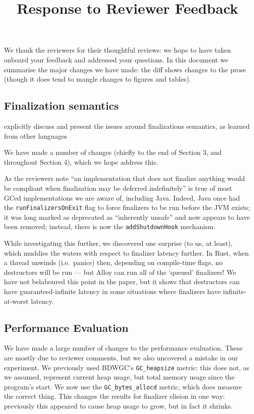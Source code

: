 \documentclass[12pt,a4paper,preprint]{article}
\newcommand\boehm{\textsc{BDWGC}\xspace}
\begin{document}
\date{}  %
\title{Response to Reviewer Feedback}
\maketitle

We thank the reviewers for their thoughtful reviews: we hope to have
taken onboard your feedback and addressed your questions. In this document
we summarise the major changes we have made: the diff shows changes to the prose
(though it does tend to mangle changes to figures and tables).


\subsection*{Finalization semantics}

\begin{blockquote}
explicitly discuss and present the issues around finalizations semantics, as
  learned from other languages
\end{blockquote}

We have made a number of changes (chiefly to the end of Section 3, and
throughout Section 4), which we hope address this.

As the reviewers note ``an
implementation that does not finalize anything would be compliant when
finalization may be deferred indefinitely'' is true of most GCed
implementations we are aware of, including Java. Indeed, Java once had the
\lstinline{runFinalizersOnExit} flag to force finalizers to be run before the
JVM exists; it was long marked as deprecated as ``inherently unsafe'' and
now appears to have been removed; instead,
there is now the \lstinline{addShutdownHook} mechanism.

While investigating this further, we discovered one surprise (to us, at least),
which muddies the waters with respect to finalizer latency further. In Rust,
when a thread unwinds (i.e.~panics) then, depending on compile-time flags, no
destructors will be run --- but Alloy can run all of the `queued' finalizers!
We have not belaboured this point in the paper, but it shows that destructors
can have guaranteed-infinite latency in some situations where finalizers have
infinite-at-worst latency.


\subsection*{Performance Evaluation}

We have made a large number of changes to the performance evaluation. These are
mostly due to reviewer comments, but we also uncovered a mistake in our
experiment. We previously used \boehm's \lstinline{GC_heapsize} metric:
this does not, as we assumed, represent current heap usage, but total
memory usage since the program's start. We now use the \lstinline{GC_bytes_allocd} metric,
which does measure the correct thing. This changes the results for finalizer
elision in one way: previously this appeared to cause heap usage to grow, but in
fact it shrinks.
\end{document}
